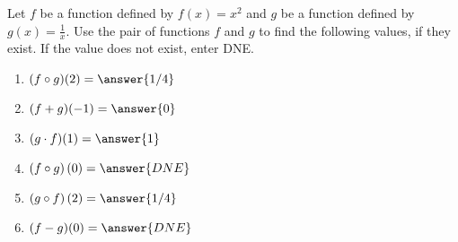 \documentclass{ximera}
\author{Kenneth Berglund}
\begin{document}
\licenseSZ
\begin{exercise}
Let $f$ be a function defined by $f(x) = x^2$ and $g$ be a function defined by $g(x) =\frac{1}{x}$. Use the pair of functions $f$ and $g$ to find the following values, if they exist. If the value does not exist, enter DNE.
\begin{enumerate}
\item $(f \circ g)(2) = \answer{1/4}$
\item $(f + g)(-1) = \answer{0}$
\item $(g \cdot f)(1) = \answer{1}$
\item $(f \circ g)\left(0\right) = \answer{DNE}$
\item $(g\circ f)\left(2\right) = \answer{1/4}$
\item $(f - g)(0) = \answer{DNE}$
\end{enumerate}

\end{exercise}
\end{document}
